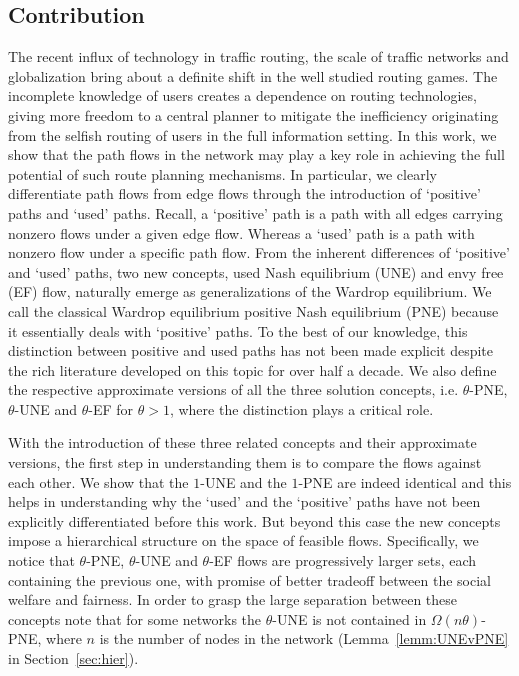 \subsection{Contribution}
The recent influx of technology in traffic routing, the scale of traffic networks and globalization bring about a definite shift in the well studied routing games. The incomplete knowledge of users creates a dependence on routing technologies, giving more freedom to a central planner to mitigate the inefficiency originating from the selfish routing of users in the full information setting. In this work, we show that the path flows in the network may play a key role in achieving the full potential of such route planning mechanisms.  In particular, we clearly differentiate path flows from edge flows through the introduction of `positive' paths and `used' paths. Recall, a `positive' path is a path with all edges carrying nonzero flows under a given edge flow. Whereas a `used' path is a path with nonzero flow under a specific path flow. From the inherent differences of `positive' and `used' paths,  two new concepts, used Nash equilibrium (UNE) and envy free (EF) flow, naturally emerge as generalizations of the Wardrop equilibrium. We call the classical Wardrop equilibrium positive Nash equilibrium (PNE) because it essentially deals with `positive' paths. To the best of our knowledge, this distinction between positive and used paths has not been made explicit despite the rich literature developed on this topic for over half a decade. We also define the respective approximate versions of all the three solution concepts, i.e. $\theta$-PNE, $\theta$-UNE and $\theta$-EF for $\theta> 1$, where the distinction plays a critical role. 


With the introduction of these three related concepts and their approximate versions, the first step in understanding them is to compare the flows against each other. We show that the $1$-UNE and the $1$-PNE are indeed identical and this helps in understanding why the `used' and the `positive' paths have not been explicitly differentiated before this work. But beyond this case the new concepts impose a hierarchical structure on the space of feasible flows. Specifically, we notice that $\theta$-PNE, $\theta$-UNE and $\theta$-EF flows are progressively larger sets, each containing the previous one, with promise of better tradeoff between the social welfare and fairness. In order to grasp the large separation between these concepts note that for some networks the $\theta$-UNE  is not contained in $\Omega(n\theta)$-PNE, where $n$ is the number of nodes in the network (Lemma~\ref{lemm:UNEvPNE} in Section~\ref{sec:hier}). 

